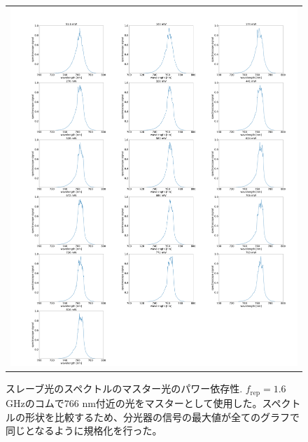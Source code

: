 \documentclass[uplatex, dvipdfmx, a4paper, report, papersize, 11pt]{jsbook}
\begin{document}
\newpage
\begin{figure}[H]
  \centering
    \begin{tabular}{c}
      \begin{minipage}{1\hsize}
        \centering
          \includegraphics[keepaspectratio,  scale=0.15,  angle=0]
                          {figures/chapter4/astro_TA_output_seed_dependency766.png}
                          \caption{スレーブ光のスペクトルのマスター光のパワー依存性. $f_\mathrm{rep} = 1.6$ GHzのコムで$766$ nm付近の光をマスターとして使用した。スペクトルの形状を比較するため、分光器の信号の最大値が全てのグラフで同じとなるように規格化を行った。}
                          \label{astro_TA_output_seed_dependency766}
      \end{minipage}
  \end{tabular}
\end{figure}
\end{document}
